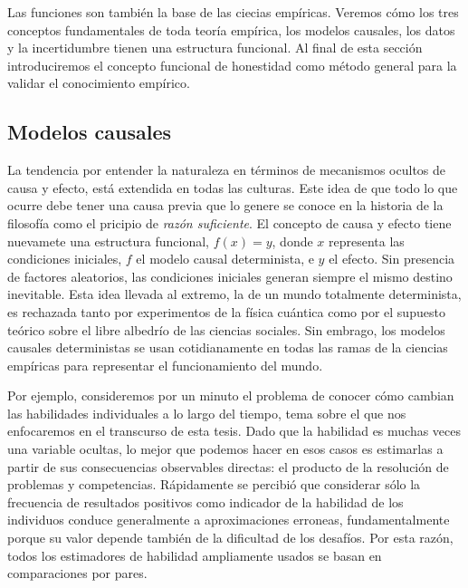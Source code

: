 \documentclass[a4paper,10pt]{book}
\begin{document}

Las funciones son también la base de las ciecias empíricas.
Veremos cómo los tres conceptos fundamentales de toda teoría empírica, los modelos causales, los datos y la incertidumbre tienen una estructura funcional.
Al final de esta sección introduciremos el concepto funcional de honestidad como método general para la validar el conocimiento empírico.

\subsection{Modelos causales}

La tendencia por entender la naturaleza en términos de mecanismos ocultos de causa y efecto, está extendida en todas las culturas.
Este idea de que todo lo que ocurre debe tener una causa previa que lo genere se conoce en la historia de la filosofía como el pricipio de \emph{razón suficiente}.
El concepto de causa y efecto tiene nuevamete una estructura funcional, $f(x) = y$, donde $x$ representa las condiciones iniciales, $f$ el modelo causal determinista, e $y$ el efecto.
Sin presencia de factores aleatorios, las condiciones iniciales generan siempre el mismo destino inevitable.
Esta idea llevada al extremo, la de un mundo totalmente determinista, es rechazada tanto por experimentos de la física cuántica como por el supuesto teórico sobre el libre albedrío de las ciencias sociales.
Sin embrago, los modelos causales deterministas se usan cotidianamente en todas las ramas de la ciencias empíricas para representar el funcionamiento del mundo.


Por ejemplo, consideremos por un minuto el problema de conocer c\'omo cambian las habilidades individuales a lo largo del tiempo, tema sobre el que nos enfocaremos en el transcurso de esta tesis.
Dado que la habilidad es muchas veces una variable ocultas, lo mejor que podemos hacer en esos casos es estimarlas a partir de sus consecuencias observables directas: el producto de la resoluci\'on de problemas y competencias.
Rápidamente se percibió que considerar s\'olo la frecuencia de resultados positivos como indicador de la habilidad de los individuos conduce generalmente a aproximaciones erroneas, fundamentalmente porque su valor depende tambi\'en de la dificultad de los desaf\'ios.
Por esta raz\'on, todos los estimadores de habilidad ampliamente usados se basan en comparaciones por pares.

\end{document}
